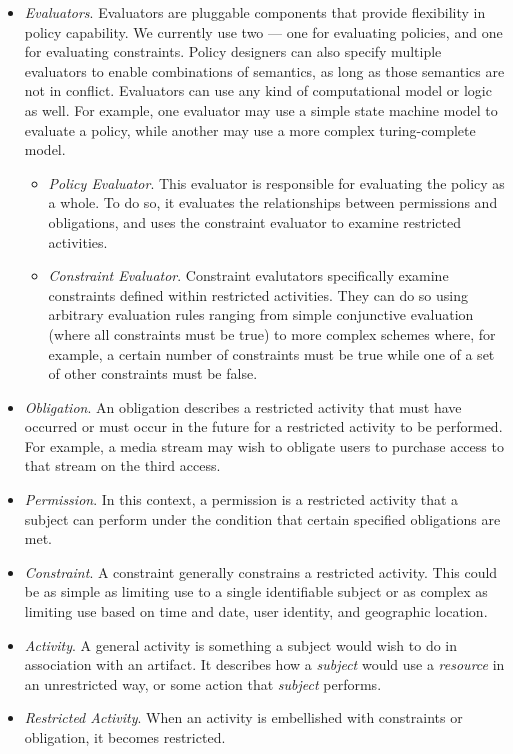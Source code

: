 \begin{itemize}
\item \textit{Evaluators}.  Evaluators are pluggable components that provide flexibility in policy capability.  We currently use two --- one for evaluating policies, and one for evaluating constraints.  Policy designers can also specify multiple evaluators to enable combinations of semantics, as long as those semantics are not in conflict.  Evaluators can use any kind of computational model or logic as well.  For example, one evaluator may use a simple state machine model to evaluate a policy, while another may use a more complex turing-complete model.
\begin{itemize}
\item \textit{Policy Evaluator}.  This evaluator is responsible for evaluating the policy as a whole.  To do so, it evaluates the relationships between permissions and obligations, and uses the constraint evaluator to examine restricted activities.
\item \textit{Constraint Evaluator}.  Constraint evalutators specifically examine constraints defined within restricted activities.  They can do so using arbitrary evaluation rules ranging from simple conjunctive evaluation (where all constraints must be true) to more complex schemes where, for example, a certain number of constraints must be true while one of a set of other constraints must be false.
\end{itemize}
\item \textit{Obligation}.  An obligation describes a restricted activity that must have occurred or must occur in the future for a restricted activity to be performed.  For example, a media stream may wish to obligate users to purchase access to that stream on the third access.
\item \textit{Permission}.  In this context, a permission is a restricted activity that a subject can perform under the condition that certain specified obligations are met.
\item \textit{Constraint}.  A constraint generally constrains a restricted activity.  This could be as simple as limiting use to a single identifiable subject or as complex as limiting use based on time and date, user identity, and geographic location.
\item \textit{Activity}.  A general activity is something a subject would wish to do in association with an artifact.  It describes how a \textit{subject} would use a \textit{resource} in an unrestricted way, or some action that \textit{subject} performs.
\item \textit{Restricted Activity}.  When an activity is embellished with constraints or obligation, it becomes restricted.
\end{itemize}

